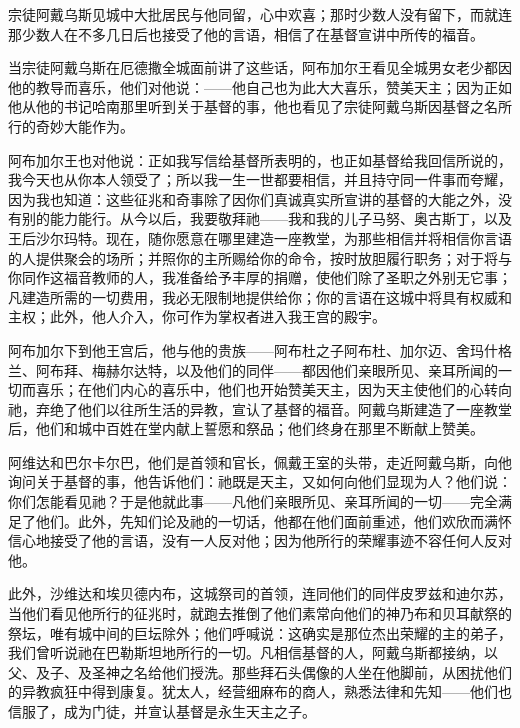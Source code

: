 宗徒阿戴乌斯见城中大批居民与他同留，心中欢喜；那时少数人没有留下，而就连那少数人在不多几日后也接受了他的言语，相信了在基督宣讲中所传的福音。\par

当宗徒阿戴乌斯在厄德撒全城面前讲了这些话，阿布加尔王看见全城男女老少都因他的教导而喜乐，他们对他说：——他自己也为此大大喜乐，赞美天主；因为正如他从他的书记哈南那里听到关于基督的事，他也看见了宗徒阿戴乌斯因基督之名所行的奇妙大能作为。\par

阿布加尔王也对他说：正如我写信给基督所表明的，也正如基督给我回信所说的，我今天也从你本人领受了；所以我一生一世都要相信，并且持守同一件事而夸耀，因为我也知道：这些征兆和奇事除了因你们真诚真实所宣讲的基督的大能之外，没有别的能力能行。从今以后，我要敬拜祂——我和我的儿子马努、奥古斯丁，以及王后沙尔玛特。现在，随你愿意在哪里建造一座教堂，为那些相信并将相信你言语的人提供聚会的场所；并照你的主所赐给你的命令，按时放胆履行职务；对于将与你同作这福音教师的人，我准备给予丰厚的捐赠，使他们除了圣职之外别无它事；凡建造所需的一切费用，我必无限制地提供给你；你的言语在这城中将具有权威和主权；此外，他人介入，你可作为掌权者进入我王宫的殿宇。\par

阿布加尔下到他王宫后，他与他的贵族——阿布杜之子阿布杜、加尔迈、舍玛什格兰、阿布拜、梅赫尔达特，以及他们的同伴——都因他们亲眼所见、亲耳所闻的一切而喜乐；在他们内心的喜乐中，他们也开始赞美天主，因为天主使他们的心转向祂，弃绝了他们以往所生活的异教，宣认了基督的福音。阿戴乌斯建造了一座教堂后，他们和城中百姓在堂内献上誓愿和祭品；他们终身在那里不断献上赞美。\par

阿维达和巴尔卡尔巴，他们是首领和官长，佩戴王室的头带，走近阿戴乌斯，向他询问关于基督的事，他告诉他们：祂既是天主，又如何向他们显现为人？他们说：你们怎能看见祂？于是他就此事——凡他们亲眼所见、亲耳所闻的一切——完全满足了他们。此外，先知们论及祂的一切话，他都在他们面前重述，他们欢欣而满怀信心地接受了他的言语，没有一人反对他；因为他所行的荣耀事迹不容任何人反对他。\par

此外，沙维达和埃贝德内布，这城祭司的首领，连同他们的同伴皮罗兹和迪尔苏，当他们看见他所行的征兆时，就跑去推倒了他们素常向他们的神乃布和贝耳献祭的祭坛，唯有城中间的巨坛除外；他们呼喊说：这确实是那位杰出荣耀的主的弟子，我们曾听说祂在巴勒斯坦地所行的一切。凡相信基督的人，阿戴乌斯都接纳，以父、及子、及圣神之名给他们授洗。那些拜石头偶像的人坐在他脚前，从困扰他们的异教疯狂中得到康复。犹太人，经营细麻布的商人，熟悉法律和先知——他们也信服了，成为门徒，并宣认基督是永生天主之子。\par


